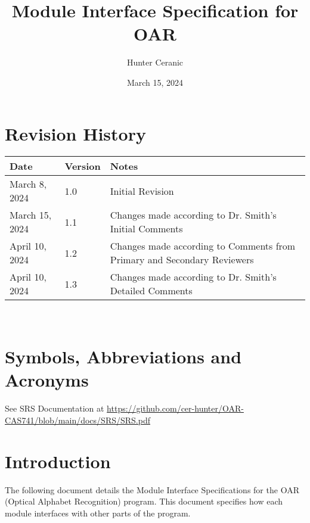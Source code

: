 \documentclass[12pt, titlepage]{article}
\begin{document}
\title{Module Interface Specification for OAR}

\author{Hunter Ceranic}

\date{March 15, 2024}

\maketitle


\section{Revision History}

\begin{tabularx}{\textwidth}{p{3cm}p{2cm}X}
\toprule {\bf Date} & {\bf Version} & {\bf Notes}\\
\midrule
March 8, 2024 & 1.0 & Initial Revision\\
March 15, 2024 & 1.1 & Changes made according to Dr. Smith's Initial Comments\\
April 10, 2024 & 1.2 & Changes made according to Comments from Primary and Secondary Reviewers\\
April 10, 2024 & 1.3 & Changes made according to Dr. Smith's Detailed Comments\\
\bottomrule
\end{tabularx}

~\newpage

\section{Symbols, Abbreviations and Acronyms}

See SRS Documentation \citep{SRS} at \url{https://github.com/cer-hunter/OAR-CAS741/blob/main/docs/SRS/SRS.pdf}

\newpage

\tableofcontents

\newpage


\section{Introduction}

The following document details the Module Interface Specifications for
the OAR (Optical Alphabet Recognition) program. This document specifies how each module
interfaces with other parts of the program.
\end{document}

